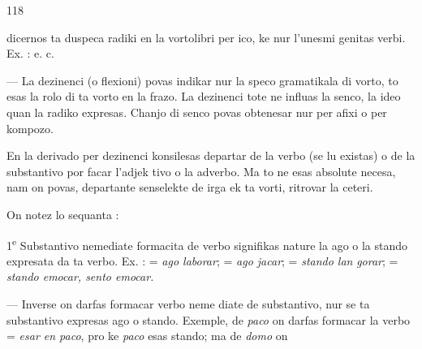 \begin{VUpage}[122]{118}

\VUcontinue
dicernos ta duspeca radiki en la vortolibri per ico, ke nur\nl
l'unesmi genitas verbi. Ex. : \nl
{} e. c.

 --- La dezinenci (o flexioni) povas indikar nur\nl
la speco gramatikala di vorto, to esas la rolo di ta vorto\nl
en la frazo. La dezinenci tote ne influas la senco, la ideo\nl
quan la radiko expresas. Chanjo di senco povas obtenesar\nl
nur per afixi o per kompozo.

\VUsaut{7.12mm}
\VUsaut{4.26mm}

\VUsaut{2.03mm}

\VUsaut{3.88mm}

En la derivado per dezinenci konsilesas departar de la\nl
verbo (se lu existas) o de la substantivo por facar l'adjek\cc
tivo o la adverbo. Ma to ne esas absolute necesa, nam on\nl
povas, departante senselekte de irga ek ta vorti, ritrovar la\nl
ceteri.

On notez lo sequanta :

1\textsuperscript{e} Substantivo nemediate formacita de verbo signifikas\nl
nature la ago o la stando expresata da ta verbo. Ex. : \nl
= \textit{ago laborar};  = \textit{ago jacar};  = \textit{stando lan}\cc
\textit{gorar};  = \textit{stando emocar, sento emocar.}

 --- Inverse on darfas formacar verbo neme\cc
diate de substantivo, nur se ta substantivo expresas ago o\nl
stando. Exemple, de \textit{paco} on darfas formacar la verbo \nl
= \textit{esar en paco}, pro ke \textit{paco} esas stando; ma de \textit{domo} on\parplein
\end{VUpage}

